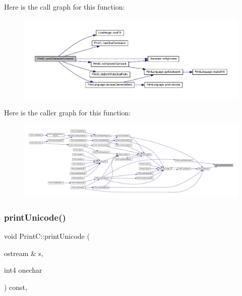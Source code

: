 Here is the call graph for this function\+:
\nopagebreak
\begin{figure}[H]
\begin{center}
\leavevmode
\includegraphics[width=350pt]{class_print_c_ad15ce25f4039ab09de56be539724f5f7_cgraph}
\end{center}
\end{figure}
Here is the caller graph for this function\+:
\nopagebreak
\begin{figure}[H]
\begin{center}
\leavevmode
\includegraphics[width=350pt]{class_print_c_ad15ce25f4039ab09de56be539724f5f7_icgraph}
\end{center}
\end{figure}
\mbox{\label{class_print_c_a56fdbb426ff8dda0d3dd29901f09ead1}} 
\subsubsection{\texorpdfstring{printUnicode()}{printUnicode()}}
{\footnotesize\ttfamily void Print\+C\+::print\+Unicode (\begin{DoxyParamCaption}\item[{ostream \&}]{s,  }\item[{int4}]{onechar }\end{DoxyParamCaption}) const\hspace{0.3cm}{\ttfamily [protected]}, {\ttfamily [virtual]}}




